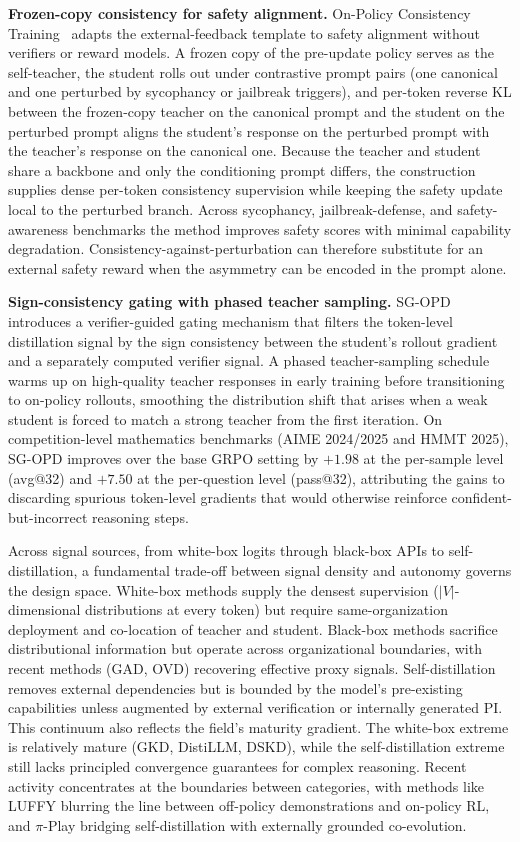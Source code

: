 \documentclass{article} %
\begin{document}
\textbf{Frozen-copy consistency for safety alignment.} On-Policy Consistency Training~\citep{2605.21834} adapts the external-feedback template to safety alignment without verifiers or reward models. A frozen copy of the pre-update policy serves as the self-teacher, the student rolls out under contrastive prompt pairs (one canonical and one perturbed by sycophancy or jailbreak triggers), and per-token reverse KL between the frozen-copy teacher on the canonical prompt and the student on the perturbed prompt aligns the student's response on the perturbed prompt with the teacher's response on the canonical one. Because the teacher and student share a backbone and only the conditioning prompt differs, the construction supplies dense per-token consistency supervision while keeping the safety update local to the perturbed branch. Across sycophancy, jailbreak-defense, and safety-awareness benchmarks the method improves safety scores with minimal capability degradation. Consistency-against-perturbation can therefore substitute for an external safety reward when the asymmetry can be encoded in the prompt alone.

\textbf{Sign-consistency gating with phased teacher sampling.} SG-OPD~\citep{2606.09304} introduces a verifier-guided gating mechanism that filters the token-level distillation signal by the sign consistency between the student's rollout gradient and a separately computed verifier signal. A phased teacher-sampling schedule warms up on high-quality teacher responses in early training before transitioning to on-policy rollouts, smoothing the distribution shift that arises when a weak student is forced to match a strong teacher from the first iteration. On competition-level mathematics benchmarks (AIME 2024/2025 and HMMT 2025), SG-OPD improves over the base GRPO setting by $+1.98$ at the per-sample level (avg@32) and $+7.50$ at the per-question level (pass@32), attributing the gains to discarding spurious token-level gradients that would otherwise reinforce confident-but-incorrect reasoning steps.

Across signal sources, from white-box logits through black-box APIs to self-distillation, a fundamental trade-off between signal density and autonomy governs the design space. White-box methods supply the densest supervision ($|V|$-dimensional distributions at every token) but require same-organization deployment and co-location of teacher and student. Black-box methods sacrifice distributional information but operate across organizational boundaries, with recent methods (GAD, OVD) recovering effective proxy signals. Self-distillation removes external dependencies but is bounded by the model's pre-existing capabilities unless augmented by external verification or internally generated PI. This continuum also reflects the field's maturity gradient. The white-box extreme is relatively mature (GKD, DistiLLM, DSKD), while the self-distillation extreme still lacks principled convergence guarantees for complex reasoning. Recent activity concentrates at the boundaries between categories, with methods like LUFFY blurring the line between off-policy demonstrations and on-policy RL, and $\pi$-Play bridging self-distillation with externally grounded co-evolution.
\end{document}
